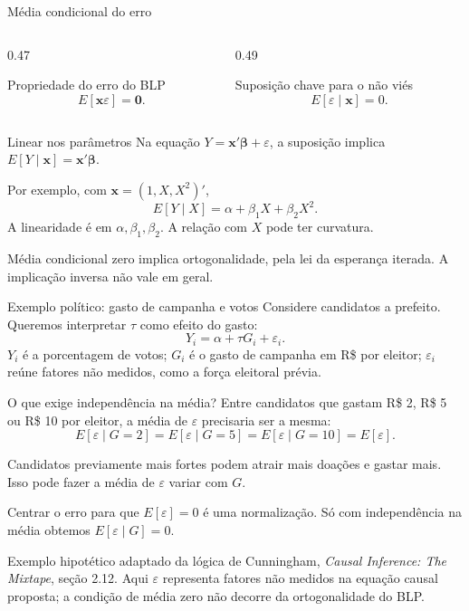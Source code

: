 \documentclass[
  ignorenonframetext,
  brazilian,
  aspectratio=169,
  10pt]{beamer}
\begin{document}
\begin{frame}{Média condicional do erro}
\protect{}\label{muxe9dia-condicional-do-erro}
\begin{columns}[T,onlytextwidth]
\begin{column}{0.47\textwidth}
\begin{block}{Propriedade do erro do BLP}
\[
E[\mathbf x\varepsilon]=\mathbf 0.
\]
\end{block}
\end{column}
\begin{column}{0.49\textwidth}
\begin{block}{Suposição chave para o não viés}
\[
E[\varepsilon\mid\mathbf x]=0.
\]
\end{block}
\end{column}
\end{columns}

\begin{block}{Linear nos parâmetros}
Na equação $Y=\mathbf x'\boldsymbol\beta+\varepsilon$, a suposição implica
$E[Y\mid\mathbf x]=\mathbf x'\boldsymbol\beta$.

Por exemplo, com $\mathbf x=(1,X,X^2)'$,
\[
E[Y\mid X]=\alpha+\beta_1X+\beta_2X^2.
\]
A linearidade é em $\alpha,\beta_1,\beta_2$.
A relação com $X$ pode ter curvatura.
\end{block}

\small

Média condicional zero implica ortogonalidade, pela lei da esperança
iterada. A implicação inversa não vale em geral.
\end{frame}

\begin{frame}{Exemplo político: gasto de campanha e votos}
\protect{}\label{exemplo-poluxedtico-gasto-de-campanha-e-votos}
Considere candidatos a prefeito. Queremos interpretar \(\tau\) como
efeito do gasto: \[
Y_i=\alpha+\tau G_i+\varepsilon_i.
\] \(Y_i\) é a porcentagem de votos; \(G_i\) é o gasto de campanha em
R\$ por eleitor; \(\varepsilon_i\) reúne fatores não medidos, como a
força eleitoral prévia.

\begin{block}{O que exige independência na média?}
Entre candidatos que gastam R\$ 2, R\$ 5 ou R\$ 10 por eleitor, a média de $\varepsilon$
precisaria ser a mesma:
\[
E[\varepsilon\mid G=2]=E[\varepsilon\mid G=5]
=E[\varepsilon\mid G=10]=E[\varepsilon].
\]
\end{block}

Candidatos previamente mais fortes podem atrair mais doações e gastar
mais. Isso pode fazer a média de \(\varepsilon\) variar com \(G\).

\small

Centrar o erro para que \(E[\varepsilon]=0\) é uma normalização. Só com
independência na média obtemos \(E[\varepsilon\mid G]=0\).

\scriptsize

Exemplo hipotético adaptado da lógica de Cunningham,
\textit{Causal Inference: The Mixtape}, seção 2.12. Aqui \(\varepsilon\)
representa fatores não medidos na equação causal proposta; a condição de
média zero não decorre da ortogonalidade do BLP.
\end{frame}
\end{document}
